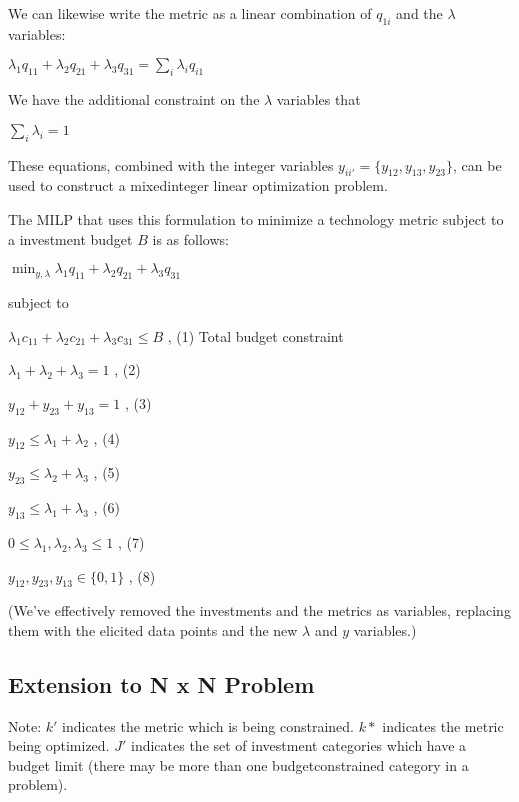 \documentclass[letterpaper,10pt,english]{sphinxmanual}
\begin{document}
\sphinxAtStartPar
We can likewise write the metric as a linear combination of \(q_{1i}\) and the \(\lambda\) variables:

\sphinxAtStartPar
\(\lambda_{1}q_{11} + \lambda_{2}q_{21} + \lambda_{3}q_{31} = \sum_{i} \lambda_{i}q_{i1}\)

\sphinxAtStartPar
We have the additional constraint on the \(\lambda\) variables that

\sphinxAtStartPar
\(\sum_{i} \lambda_{i} = 1\)

\sphinxAtStartPar
These equations, combined with the integer variables \(y_{ii'} = \{ y_{12}, y_{13}, y_{23} \}\), can be used to construct a mixed\sphinxhyphen{}integer linear optimization problem.

\sphinxAtStartPar
The MILP that uses this formulation to minimize a technology metric subject to a investment budget \(B\) is as follows:

\sphinxAtStartPar
\(\min_{y, \lambda} \lambda_{1}q_{11} + \lambda_{2}q_{21} + \lambda_{3}q_{31}\)

\sphinxAtStartPar
subject to

\sphinxAtStartPar
\(\lambda_{1}c_{11} + \lambda_{2}c_{21} + \lambda_{3}c_{31} \leq B\) , (1) Total budget constraint

\sphinxAtStartPar
\(\lambda_1 + \lambda_2 + \lambda_3 = 1\) , (2)

\sphinxAtStartPar
\(y_{12} + y_{23} + y_{13} = 1\) , (3)

\sphinxAtStartPar
\(y_{12} \leq \lambda_1 + \lambda_2\) , (4)

\sphinxAtStartPar
\(y_{23} \leq \lambda_2 + \lambda_3\) , (5)

\sphinxAtStartPar
\(y_{13} \leq \lambda_1 + \lambda_3\) , (6)

\sphinxAtStartPar
\(0 \leq \lambda_1, \lambda_2, \lambda_3 \leq 1\) , (7)

\sphinxAtStartPar
\(y_{12}, y_{23}, y_{13} \in \{ 0, 1 \}\) , (8)

\sphinxAtStartPar
(We’ve effectively removed the investments and the metrics as variables, replacing them with the elicited data points and the new \(\lambda\) and \(y\) variables.)


\subsection{Extension to N x N Problem}
\label{\detokenize{optimizers:extension-to-n-x-n-problem}}
\sphinxAtStartPar
Note: \(k'\) indicates the metric which is being constrained. \(k*\) indicates the metric being optimized. \(J'\) indicates the set of investment categories which have a budget limit (there may be more than one budget\sphinxhyphen{}constrained category in a problem).
\end{document}
